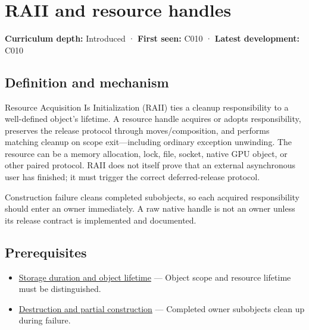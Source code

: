 \hypertarget{appendix-69739d3ab49b}{}\label{referencestart:appendix-69739d3ab49b}
\section{RAII and resource handles}\label{appendix-69739d3ab49b-raii-and-resource-handles}

\textbf{Curriculum depth:} Introduced · \textbf{First seen:} C010 · \textbf{Latest development:} C010

\begin{allmightroledefinition}

\subsection{Definition and mechanism}\label{appendix-69739d3ab49b-definition-and-mechanism}

Resource Acquisition Is Initialization (RAII) ties a cleanup responsibility to a well-defined object's lifetime. A resource handle acquires or adopts responsibility, preserves the release protocol through moves/composition, and performs matching cleanup on scope exit---including ordinary exception unwinding. The resource can be a memory allocation, lock, file, socket, native GPU object, or other paired protocol. RAII does not itself prove that an external asynchronous user has finished; it must trigger the correct deferred-release protocol.

\end{allmightroledefinition}

Construction failure cleans completed subobjects, so each acquired responsibility should enter an owner immediately. A raw native handle is not an owner unless its release contract is implemented and documented.

\subsection{Prerequisites}\label{appendix-69739d3ab49b-prerequisites}

\begin{itemize}
\tightlist
\item
  \hyperref[appendix-0b104bcba06b]{Storage duration and object lifetime} --- Object scope and resource lifetime must be distinguished.
\item
  \hyperref[appendix-9bfe377cef7a]{Destruction and partial construction} --- Completed owner subobjects clean up during failure.
\end{itemize}

